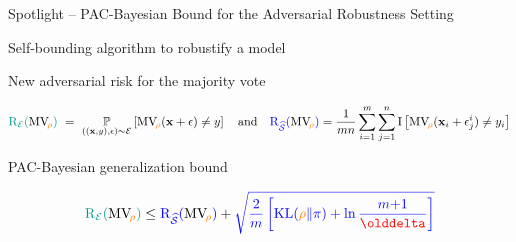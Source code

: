 \documentclass{slides}
\begin{document}

\begin{xframe}{Spotlight -- {\small PAC-Bayesian Bound for the Adversarial Robustness Setting}}

\vspace{-0.1cm}

 Self-bounding algorithm to robustify a model\\[-0.1cm]
\begin{figure}[H]
\end{figure}

\vspace{-0.2cm}

 New adversarial risk for the majority vote

\vspace{-0.6cm}

\begin{align*}
    \green{\Risk_{\Dpert}(\MVQ)} \ =\  \PP_{((\x,\y), \epsilon)\sim \Dpert}\LB\MVQ(\x+\epsilon) \neq \y\RB\quad\text{and}\quad \blue{\Risk_{\dSpert}(\MVQ)} = \frac{1}{mn} \sum_{i=1}^\m\sum_{j=1}^n \indic\LB\MVQ(\x_i+\epsilon^i_j) \neq \y_i\RB
\end{align*}

 PAC-Bayesian generalization bound

\vspace{-0.6cm}
\begin{align*}
    \green{\Risk_{\Dpert}(\MVQ)} \le \blue{\Risk_{\dSpert}(\MVQ)} + \blue{\sqrt{\frac{2}{m}\LB \KL(\Q\|\P) + \ln\frac{m{+}1}{\delta}\RB}}
\end{align*}
\end{xframe}

\end{document}
